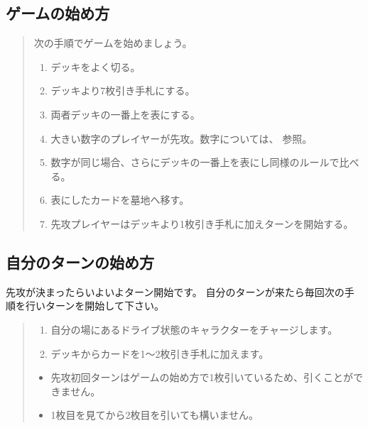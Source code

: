 \documentclass[letterpaper,10pt,dvipdfmx]{sphinxmanual}
\begin{document}
\subsection{ゲームの始め方}
\label{\detokenize{common/02-turn:id2}}\begin{quote}

次の手順でゲームを始めましょう。
\begin{enumerate}
%
\item {} 
デッキをよく切る。

\item {} 
デッキより7枚引き手札にする。

\item {} 
両者デッキの一番上を表にする。

\item {} 
大きい数字のプレイヤーが先攻。数字については、 {\hyperref[\detokenize{common/01-base:cardrank}]{}} 参照。

\item {} 
数字が同じ場合、さらにデッキの一番上を表にし同様のルールで比べる。

\item {} 
表にしたカードを墓地へ移す。

\item {} 
先攻プレイヤーはデッキより1枚引き手札に加えターンを開始する。

\end{enumerate}
\end{quote}


\subsection{自分のターンの始め方}
\label{\detokenize{common/02-turn:id3}}
先攻が決まったらいよいよターン開始です。
自分のターンが来たら毎回次の手順を行いターンを開始して下さい。
\begin{quote}
\begin{enumerate}
%
\item {} 
自分の場にあるドライブ状態のキャラクターをチャージします。

\item {} 
デッキからカードを1〜2枚引き手札に加えます。

\end{enumerate}
\begin{itemize}
\item {} 
先攻初回ターンはゲームの始め方で1枚引いているため、引くことができません。

\item {} 
1枚目を見てから2枚目を引いても構いません。

\end{itemize}
\end{quote}
\end{document}
